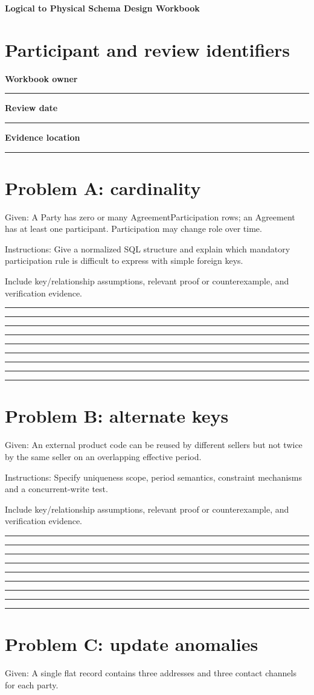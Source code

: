 \documentclass[11pt,letterpaper]{article}
\newcommand{\ResponseLine}{\par\vspace{1.05em}\noindent\rule{\linewidth}{0.4pt}\par}
\newcommand{\ResponseArea}{\ResponseLine\ResponseLine\ResponseLine}
\begin{document}
\begin{center}
{\LARGE\bfseries\color{navy} Logical to Physical Schema Design Workbook}\par
\vspace{0.25em}{\large Printable Template | guided exercises}\par
{}
\end{center}
\vspace{0.8em}
\section{Participant and review identifiers}
\textbf{Workbook owner}\ResponseLine\textbf{Review date}\ResponseLine\textbf{Evidence location}\ResponseLine
\section{Problem A: cardinality}
Given: A Party has zero or many AgreementParticipation rows; an Agreement has at least one participant. Participation may change role over time.


Instructions: Give a normalized SQL structure and explain which mandatory participation rule is difficult to express with simple foreign keys.

Include key/relationship assumptions, relevant proof or counterexample, and verification evidence.

\ResponseArea\ResponseArea\ResponseArea
\section{Problem B: alternate keys}
Given: An external product code can be reused by different sellers but not twice by the same seller on an overlapping effective period.


Instructions: Specify uniqueness scope, period semantics, constraint mechanisms and a concurrent-write test.

Include key/relationship assumptions, relevant proof or counterexample, and verification evidence.

\ResponseArea\ResponseArea\ResponseArea
\section{Problem C: update anomalies}
Given: A single flat record contains three addresses and three contact channels for each party.
\end{document}
